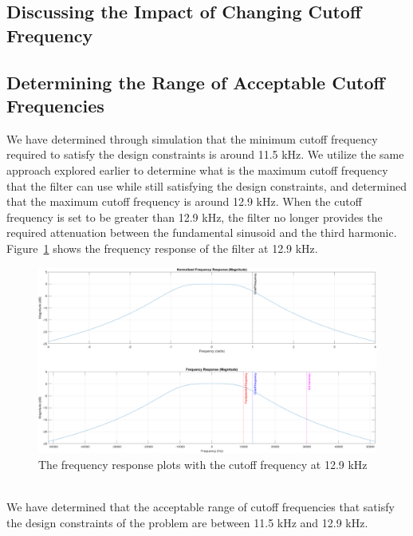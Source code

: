 \documentclass[12pt]{article}
\begin{document}
\subsection*{Discussing the Impact of Changing Cutoff Frequency}

\subsection*{Determining the Range of Acceptable Cutoff Frequencies}
We have determined through simulation that the minimum cutoff frequency required to satisfy the design constraints is around 11.5 kHz. We utilize the same approach explored earlier to determine what is the maximum cutoff frequency that the filter can use while still satisfying the design constraints, and determined that the maximum cutoff frequency is around 12.9 kHz. When the cutoff frequency is set to be greater than 12.9 kHz, the filter no longer provides the required attenuation between the fundamental sinusoid and the third harmonic. Figure~\ref{fig:max_freq_response} shows the frequency response of the filter at 12.9 kHz.
\begin{figure}[h!]
    \includegraphics[width=\textwidth]{max_frequency_response.png}
    \caption{\label{fig:max_freq_response} The frequency response plots with the cutoff frequency at 12.9 kHz}
\end{figure} \\

We have determined that the acceptable range of cutoff frequencies that satisfy the design constraints of the problem are between 11.5 kHz and 12.9 kHz.
\end{document}
